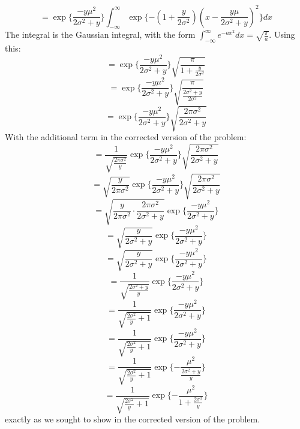 \documentclass{article}
\begin{document}
{\[\]
\[
  = \exp\{\frac{-y\mu^2}{2\sigma^2 + y}\} \int_{-\infty}^{\infty} \exp\{ -(1 + \frac{y}{2\sigma^2})(x - \frac{y\mu}{2\sigma^2 + y})^2 \} dx
\]
The integral is the Gaussian integral, with the form \(\int_{-\infty}^{\infty} e^{-ax^2} dx = \sqrt{\frac{\pi}{a}}\). Using this:
\[
  = \exp\{\frac{-y\mu^2}{2\sigma^2 + y}\} \sqrt{\frac{\pi}{1 + \frac{y}{2\sigma^2}}}
\]
\[
  = \exp\{\frac{-y\mu^2}{2\sigma^2 + y}\} \sqrt{\frac{\pi}{\frac{2\sigma^2 + y}{2\sigma^2}}}
\]
\[
  = \exp\{\frac{-y\mu^2}{2\sigma^2 + y}\} \sqrt{\frac{2\pi\sigma^2}{2\sigma^2 + y}}
\]
With the additional term in the corrected version of the problem:
\[
  = \frac{1}{\sqrt{\frac{2\pi\sigma^2}{y}}}\exp\{\frac{-y\mu^2}{2\sigma^2 + y}\} \sqrt{\frac{2\pi\sigma^2}{2\sigma^2 + y}}
\]
\[
  = \sqrt{\frac{y}{2\pi\sigma^2}}\exp\{\frac{-y\mu^2}{2\sigma^2 + y}\} \sqrt{\frac{2\pi\sigma^2}{2\sigma^2 + y}}
\]
\[
  = \sqrt{\frac{y}{2\pi\sigma^2} \cdot \frac{2\pi\sigma^2}{2\sigma^2 + y}}\exp\{\frac{-y\mu^2}{2\sigma^2 + y}\}
\]
\[
  = \sqrt{\frac{y}{2\sigma^2 + y}}\exp\{\frac{-y\mu^2}{2\sigma^2 + y}\}
\]
\[
  = \sqrt{\frac{y}{2\sigma^2 + y}}\exp\{\frac{-y\mu^2}{2\sigma^2 + y}\}
\]
\[
  = \frac{1}{\sqrt{\frac{2\sigma^2 + y}{y}}}\exp\{\frac{-y\mu^2}{2\sigma^2 + y}\}
\]
\[
  = \frac{1}{\sqrt{\frac{2\sigma^2}{y} + 1}}\exp\{\frac{-y\mu^2}{2\sigma^2 + y}\}
\]
\[
  = \frac{1}{\sqrt{\frac{2\sigma^2}{y} + 1}}\exp\{\frac{-y\mu^2}{2\sigma^2 + y}\}
\]
\[
  = \frac{1}{\sqrt{\frac{2\sigma^2}{y} + 1}}\exp\{-\frac{\mu^2}{\frac{2\sigma^2 + y}{y}}\}
\]
\[
  = \boxed{\frac{1}{\sqrt{\frac{2\sigma^2}{y} + 1}}\exp\{-\frac{\mu^2}{1 + \frac{2\sigma^2}{y}}\}}
\]
exactly as we sought to show in the corrected version of the problem.

}
\end{document}
